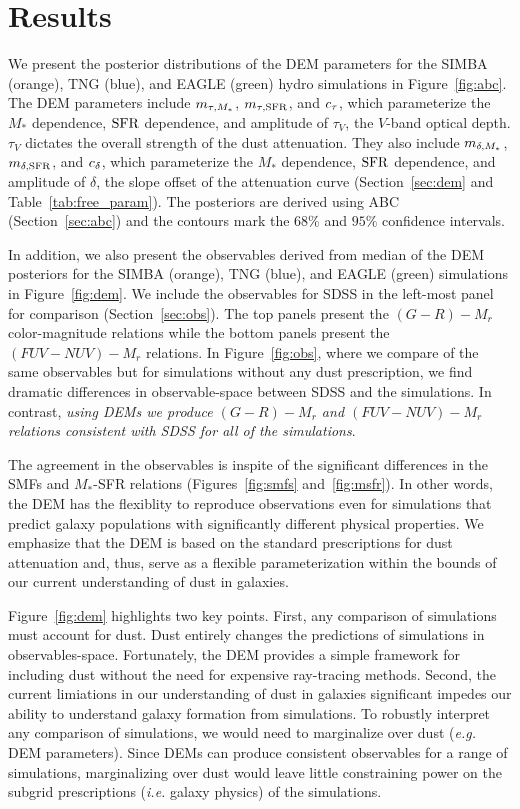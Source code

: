 \section{Results} \label{sec:results}
We present the posterior distributions of the DEM parameters for the SIMBA
(orange), TNG (blue), and EAGLE (green) hydro simulations in
Figure~\ref{fig:abc}. The DEM parameters include $m_{\tau,M_*}$, $m_{\tau,{\rm SFR}}$, and
$c_\tau$, which parameterize the $M_*$ dependence, ${\rm SFR}$ dependence, and 
amplitude of $\tau_V$, the $V$-band optical depth. $\tau_V$ dictates the
overall strength of the dust attenuation. They also include $m_{\delta,M_*}$,
$m_{\delta,{\rm SFR}}$, and $c_\delta$, which parameterize the $M_*$ dependence, ${\rm SFR}$ dependence,
and amplitude of $\delta$, the slope offset of the attenuation curve
(Section~\ref{sec:dem} and Table~\ref{tab:free_param}). The posteriors 
are derived using ABC (Section~\ref{sec:abc}) and the contours mark the 
$68\%$ and $95\%$ confidence intervals. 

In addition, we also present the observables derived from median of the DEM
posteriors for the SIMBA (orange), TNG (blue), and EAGLE (green) simulations 
in Figure~\ref{fig:dem}. We include the observables for SDSS in the left-most 
panel for comparison (Section~\ref{sec:obs}). The top panels present the $(G-R) - M_r$ 
color-magnitude relations while the bottom panels present the $(FUV-NUV) - M_r$
relations. In Figure~\ref{fig:obs}, where we compare of the same observables
but for simulations without any dust prescription, we find dramatic differences 
in observable-space between SDSS and the simulations. In contrast, {\em using
DEMs we produce $(G-R) - M_r$ and $(FUV-NUV) - M_r$ relations consistent with
SDSS for all of the simulations}. 

The agreement in the observables is inspite of the significant differences 
in the SMFs and $M_*$-SFR relations (Figures~\ref{fig:smfs} and~\ref{fig:msfr}). 
In other words, the DEM has the flexiblity to reproduce observations even for 
simulations that predict galaxy populations with significantly different
physical properties. We emphasize that the DEM is based on the standard
prescriptions for dust attenuation and, thus, serve as a flexible
parameterization within the bounds of our current understanding of dust in galaxies.

Figure~\ref{fig:dem} highlights two key points. First, any comparison of
simulations must account for dust. Dust entirely changes the predictions of
simulations in observables-space. Fortunately, the DEM provides a simple framework
for including dust without the need for expensive ray-tracing methods. 
Second, the current limiations in our understanding of dust in galaxies 
significant impedes our ability to understand galaxy formation from simulations. 
To robustly interpret any comparison of simulations, we would need to
marginalize over dust (\emph{e.g.} DEM parameters). Since DEMs can produce
consistent observables for a range of simulations, marginalizing over dust
would leave little constraining power on the subgrid prescriptions (\emph{i.e.}
galaxy physics) of the simulations. 

